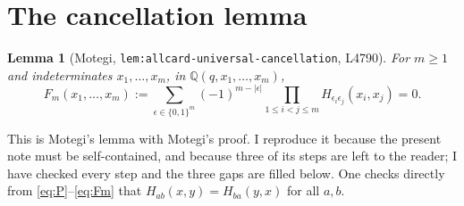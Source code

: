 \documentclass[11pt]{article}
\theoremstyle{plain}
\newtheorem{lem}[thm]{Lemma}
\theoremstyle{definition}
\theoremstyle{remark}
\begin{document}
\section{The cancellation lemma}
\label{sec:cancel}

\begin{lem}[Motegi, \texttt{lem:allcard-universal-cancellation}, L4790]
\label{lem:cancel}
For $m\ge1$ and indeterminates $x_1,\dots,x_m$, in
$\mathbb Q(q,x_1,\dots,x_m)$,
\begin{equation}
F_m(x_1,\dots,x_m):=
\sum_{\epsilon\in\{0,1\}^m}(-1)^{m-|\epsilon|}
\prod_{1\le i<j\le m}H_{\epsilon_i\epsilon_j}(x_i,x_j)=0 .
\label{eq:Fm}
\end{equation}
\end{lem}

\noindent
This is Motegi's lemma with Motegi's proof. I reproduce it because the present note
must be self-contained, and because three of its steps are left to the reader; I
have checked every step and the three gaps are filled below. One checks directly
from \eqref{eq:P}--\eqref{eq:Fm} that $H_{ab}(x,y)=H_{ba}(y,x)$ for all $a,b$.
\end{document}
